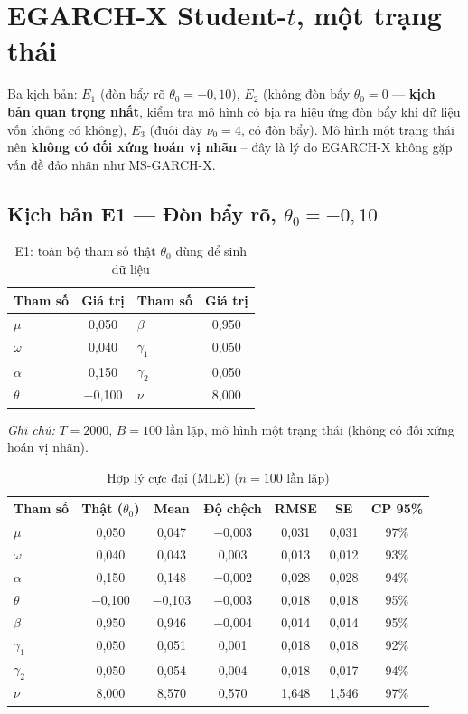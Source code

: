 \documentclass[11pt,a4paper]{article}
\begin{document}
\clearpage
\section{EGARCH-X Student-$t$, một trạng thái}

Ba kịch bản: $E_1$ (đòn bẩy rõ $\theta_0=-0{,}10$), $E_2$ (không đòn bẩy
$\theta_0=0$ --- \textbf{kịch bản quan trọng nhất}, kiểm tra mô hình có bịa ra
hiệu ứng đòn bẩy khi dữ liệu vốn không có không), $E_3$ (đuôi dày $\nu_0=4$, có
đòn bẩy). Mô hình một trạng thái nên \textbf{không có đối xứng hoán vị nhãn} --
đây là lý do EGARCH-X không gặp vấn đề đảo nhãn như MS-GARCH-X.

\subsection*{Kịch bản E1 --- Đòn bẩy rõ, $\theta_0=-0{,}10$}
\begin{table}[H]\centering\normalsize
\caption{E1: toàn bộ tham số thật $\theta_0$ dùng để sinh dữ liệu}
\begin{tabularx}{\textwidth}{l C  l C}
\toprule
\textbf{Tham số} & \textbf{Giá trị} & \textbf{Tham số} & \textbf{Giá trị} \\
\midrule
$\mu$ & 0,050 & $\beta$ & 0,950 \\
$\omega$ & 0,040 & $\gamma_1$ & 0,050 \\
$\alpha$ & 0,150 & $\gamma_2$ & 0,050 \\
$\theta$ & $-$0,100 & $\nu$ & 8,000 \\
\bottomrule
\end{tabularx}
\vspace{0.2em}\raggedright\scriptsize \emph{Ghi chú:} $T=2000$, $B=100$ lần lặp, mô hình một trạng thái (không có đối xứng hoán vị nhãn).
\end{table}

\begin{table}[H]\centering\footnotesize
\caption{Hợp lý cực đại (MLE) ($n=100$ lần lặp)}
\begin{tabularx}{\textwidth}{l C C C C C C}
\toprule
\textbf{Tham số} & \textbf{Thật ($\theta_0$)} & \textbf{Mean} & \textbf{Độ chệch} & \textbf{RMSE} & \textbf{SE} & \textbf{CP 95\%} \\
\midrule
$\mu$ & 0,050 & 0,047 & $-$0,003 & 0,031 & 0,031 & 97\% \\
$\omega$ & 0,040 & 0,043 & 0,003 & 0,013 & 0,012 & 93\% \\
$\alpha$ & 0,150 & 0,148 & $-$0,002 & 0,028 & 0,028 & 94\% \\
$\theta$ & $-$0,100 & $-$0,103 & $-$0,003 & 0,018 & 0,018 & 95\% \\
$\beta$ & 0,950 & 0,946 & $-$0,004 & 0,014 & 0,014 & 95\% \\
$\gamma_1$ & 0,050 & 0,051 & 0,001 & 0,018 & 0,018 & 92\% \\
$\gamma_2$ & 0,050 & 0,054 & 0,004 & 0,018 & 0,017 & 94\% \\
$\nu$ & 8,000 & 8,570 & 0,570 & 1,648 & 1,546 & 97\% \\
\bottomrule
\end{tabularx}
\end{table}
\end{document}
